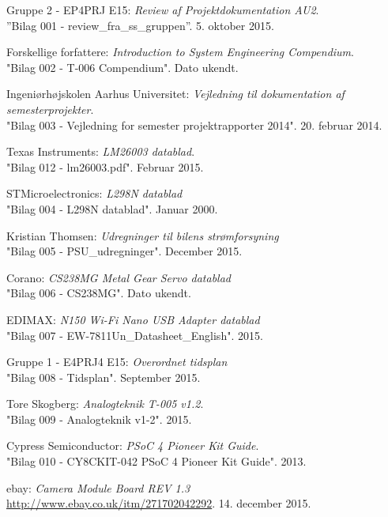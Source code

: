 	\fancyhead[CE,CO]{}
\renewcommand{\bibname}{Litteraturliste}
\begin{thebibliography}{2}

 Gruppe 2 - EP4PRJ E15: \textit{Review af Projektdokumentation AU2}.\\
''Bilag 001 - review\_fra\_ss\_gruppen''. 5. oktober 2015.

 Forskellige forfattere: \textit{Introduction to System Engineering
Compendium}. \\
"Bilag 002 - T-006 Compendium". Dato ukendt.

 Ingeniørhøjskolen Aarhus Universitet: \textit{Vejledning til dokumentation af semesterprojekter}. \\
"Bilag 003 - Vejledning for semester projektrapporter 2014". 20. februar 2014.

 Texas Instruments: \textit{LM26003 datablad}. \\
"Bilag 012 - lm26003.pdf". Februar 2015.

 STMicroelectronics: \textit{L298N datablad} \\
"Bilag 004 - L298N datablad". Januar 2000.

 Kristian Thomsen: \textit{Udregninger til bilens strømforsyning} \\
"Bilag 005 - PSU\_udregninger". December 2015.

 Corano: \textit{CS238MG Metal Gear Servo datablad}\\
"Bilag 006 - CS238MG". Dato ukendt.

 EDIMAX: \textit{N150 Wi-Fi Nano USB Adapter datablad} \\
"Bilag 007 - EW-7811Un\_Datasheet\_English". 2015.

 Gruppe 1 - E4PRJ4 E15: \textit{Overordnet tidsplan} \\
"Bilag 008 - Tidsplan". September 2015.

 Tore Skogberg: \textit{Analogteknik T-005 v1.2}.\\
"Bilag 009 - Analogteknik v1-2". 2015.

 Cypress Semiconductor: \textit{PSoC 4 Pioneer Kit Guide}. \\
"Bilag 010 - CY8CKIT-042 PSoC 4 Pioneer Kit Guide". 2013.

 ebay: \textit{Camera Module Board REV 1.3} \\
\url{http://www.ebay.co.uk/itm/271702042292}. 14. december 2015.


\end{thebibliography}
